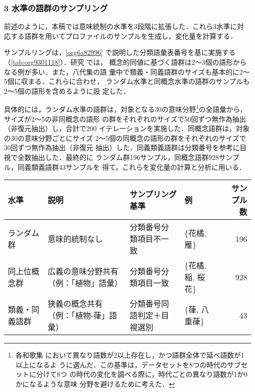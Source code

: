 \documentclass[submit]{ipsj}
\renewcommand{\ref}{\cref}
\begin{document}
\subsubsection{3 水準の語群のサンプリング\label{orgee6e5e8}}
\label{sec:org9752d04}
前述のように，本稿では意味統制の水準を3段階に拡張した．これら3水準に対
応する語群を用いてプロファイルのサンプルを生成し，変化量を計算する．

サンプルリングは，\ref{org6a82996} で説明した分類語彙表番号を基に実施する
（\ref{tab:org9301118}）．研究 \cite{Speelman2003Profilebased} では，
概念的同値に基づく語群は2～3個の語形からなる例が多い．また，八代集の語
彙中で類義・同義語群のサイズも基本的に2～5個に収まる．これらに合わせ，
ランダム水準と同概念水準の語群のサンプルも2～5個の語形を含めるように設
定した．

具体的には，ランダム水準の語群は，対象となる30の意味分野\footnote{各和歌集
において異なり語数が2以上存在し，かつ語群全体で延べ語数が1以上になるよ
うに選んだ．この基準は，データセットを8つの時代のサブセットに分けて8つ
の時代の変化を調べる際に，時代ごとの異なり語数が1か0かになるような意味
分野を避けるために考えた．}の全語彙から，サイズが2～5の非同概念の語形
の群をそれぞれのサイズで50回ずつ無作為抽出（非復元抽出）し，合計で200
イテレーションを実施した．同概念語群は，対象の30の意味分野ごとにサイズ
2～5個の同概念の語形の群をそれぞれのサイズで30回ずつ無作為抽出（非復元
抽出）した．同義類義語群は分類番号を参考に目視で全数抽出した．最終的に
ランダム群196サンプル，同概念語群928サンプル，同義類義語群43サンプルを
得て，これらを変化量の計算と分析に用いる．

\begin{table*}[tb]
\caption{\label{tab:org9301118}3水準の語形集合のサンプル例}
\centering
\begin{tabular}{llllr}
水準 & 説明 & サンプリング基準 & 例 & サンプル数\\
\hline
ランダム群 & 意味的統制なし & 分類番号分類項目不一致 & \{花橘, 雁\} & 196\\
同上位概念群 & 広義の意味分野共有（例：「植物」語彙） & 分類番号分類項目一致 & \{花橘, 稲, 桜花\} & 928\\
類義・同義語群 & 狭義の概念共有（例：「植物-葎」語彙） & 分類番号同語判定＋目視選別 & \{葎, 八重葎\} & 43\\
\end{tabular}
\end{table*}
\end{document}
